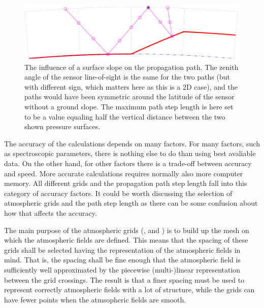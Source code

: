 \begin{figure}[!p]
 \begin{center}
  \includegraphics*[width=0.95\hsize]{Figs/fm_definitions/ppath_ground}
  \caption{The influence of a surface slope on the propagation path. The zenith
    angle of the sensor line-of-sight is the same for the two paths (but with
    different sign, which matters here as this is a 2D case), and the paths
    would have been symmetric around the latitude of the sensor without a 
    ground slope. The maximum path step length is here set to be a value
    equaling half the vertical distance between the two shown pressure
    surfaces.}
  \label{fig:fm_defs:ppath_ground}
 \end{center}
\end{figure}



\label{sec:fm_defs:accuracy}

The accuracy of the calculations depends on many factors. For many
factors, such as spectroscopic parameters, there is nothing else to do
than using best avaliable data. On the other hand, for other factors
there is a trade-off between accuracy and speed. More accurate
calculations requires normally also more computer memory. All
different grids and the propagation path step length fall into this
category of accuracy factors. It could be worth discussing the
selection of atmospheric grids and the path step length as there can
be some confusion about how that affects the accuracy.

The main purpose of the atmospheric grids (,
 and ) is to build up the
mesh on which the atmospheric fields are defined. This means that the
spacing of these grids shall be selected having the representation of
the atmospheric fields in mind. That is, the spacing shall be fine
enough that the atmospheric field is sufficiently well approximated by
the piecewise (multi-)linear representation between the grid
crossings. The result is that a finer spacing must be used to
represent correctly atmospheric fields with a lot of structure, while
the grids can have fewer points when the atmsopheric fields are
smooth. 

